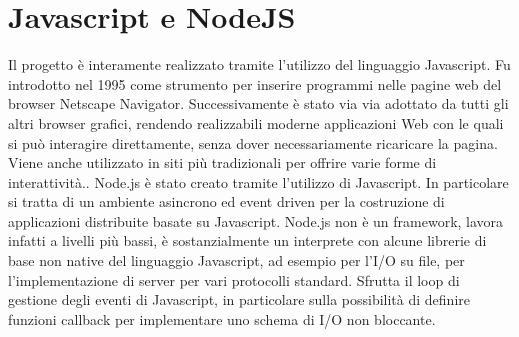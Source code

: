\section{Javascript e NodeJS}
Il progetto è interamente realizzato tramite l'utilizzo del linguaggio Javascript. Fu introdotto nel 1995 come strumento per inserire programmi nelle pagine web del browser Netscape Navigator. Successivamente è stato via via adottato da tutti gli altri browser grafici, rendendo realizzabili moderne applicazioni Web con le quali si può interagire direttamente, senza dover necessariamente ricaricare la pagina. Viene anche utilizzato in siti più tradizionali per offrire varie forme di interattività.\cite{JS}. Node.js è stato creato tramite l'utilizzo di Javascript. In particolare si tratta di un ambiente asincrono ed event driven per la costruzione di applicazioni distribuite basate su Javascript. Node.js non è un framework, lavora infatti a livelli più bassi, è sostanzialmente un interprete con alcune librerie di base non native del linguaggio Javascript, ad esempio per l’I/O su file, per l’implementazione di 
server per vari protocolli standard. Sfrutta il loop di gestione degli eventi di Javascript, in particolare sulla possibilità 
di definire funzioni callback per implementare uno schema di I/O non 
bloccante.

